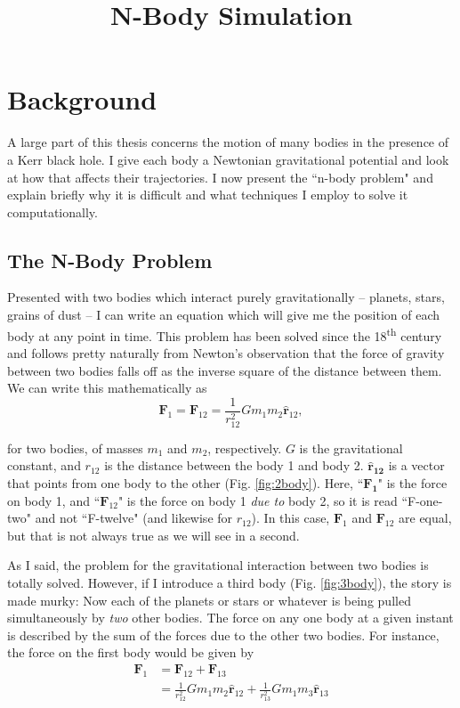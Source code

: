 \documentclass[11pt]{article}
\title{N-Body Simulation}
\date{}                                           %
\begin{document}
\maketitle
\section{Background}
A large part of this thesis concerns the motion of many bodies in the presence of a Kerr black hole.  I give each body a Newtonian gravitational potential and look at how that affects their trajectories.  I now present the ``n-body problem" and explain briefly why it is difficult and what techniques I employ to solve it computationally.
\subsection{The N-Body Problem}\label{sec:nbody-intro}
Presented with two bodies which interact purely gravitationally \--- planets, stars, grains of dust \--- I can write an equation which will give me the position of each body at any point in time.  This problem has been solved since the 18\textsuperscript{th} century and follows pretty naturally from Newton's observation that the force of gravity between two bodies falls off as the inverse square of the distance between them.  We can write this mathematically as
\begin{equation*}
\mathbf{F}_1 = \mathbf{F}_{12} = \frac{1}{r_{12}^2}G m_1 m_2\mathbf{\hat{r}}_{12},
\end{equation*}

 for two bodies, of masses $m_1$ and $m_2$, respectively.  $G$ is the gravitational constant, and $r_{12}$ is the distance between the body 1 and body 2.   $\mathbf{\hat{r}_{12}}$ is a vector that points from one body to the other (Fig. \ref{fig:2body}).  Here, ``$\mathbf{F_1}$" is the force on body 1, and ``$\mathbf{F}_{12}$" is the force on body 1 \emph{due to} body 2, so it is read ``F-one-two" and not ``F-twelve" (and likewise for $r_{12}$).  In this case, $\mathbf{F}_1$ and $\mathbf{F}_{12}$ are equal, but that is not always true as we will see in a second. 


As I said, the problem for the gravitational interaction between two bodies is totally solved.  However, if I introduce a third body (Fig. \ref{fig:3body}), the story is made murky:  Now each of the planets or stars or whatever is being pulled simultaneously by \emph{two} other bodies.  The force on any one body at a given instant is described by the sum of the forces due to the other two bodies.  For instance, the force on the first body would be given by
\begin{align*}
\mathbf{F}_1 &= \mathbf{F}_{12}+\mathbf{F}_{13}\\
&= \frac{1}{r_{12}^2}G m_1 m_2 \mathbf{\hat{r}}_{12} +  \frac{1}{r_{13}^2}G m_1 m_3 \mathbf{\hat{r}}_{13}
\end{align*}
\end{document}
